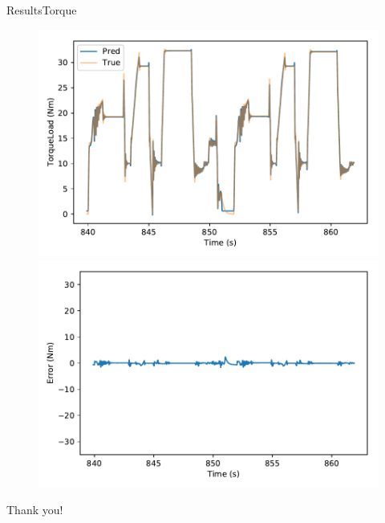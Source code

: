 \documentclass[handout]{beamer}
\begin{document}
\begin{frame}{Results}{Torque}
\begin{center}
  \begin{figure}
  \includegraphics[scale=0.4]{images/torqueload_pred_vs_time} \\
  \includegraphics[scale=0.4]{images/torque_error_vs_time}
  \end{figure}
\end{center}
\end{frame}





\begin{frame}
\center
\color{blue}
\huge{Thank you!}\\
\end{frame}
\end{document}
